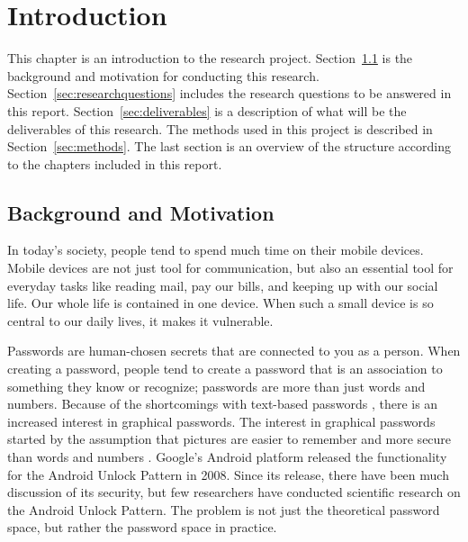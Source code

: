 \chapter{Introduction}

  This chapter is an introduction to the research project. Section~\ref{sec:background} is the background and motivation for conducting this research. Section~\ref{sec:researchquestions} includes the research questions to be answered in this report. Section~\ref{sec:deliverables} is a description of what will be the deliverables of this research.
  The methods used in this project is described in Section~\ref{sec:methods}. The last section is an overview of the structure according to the chapters included in this report. 

  \clearpage
  \section{Background and Motivation} \label{sec:background}
    In today's society, people tend to spend much time on their mobile devices. Mobile devices are not just tool for communication, but also an essential tool for everyday tasks like reading mail, pay our bills, and keeping up with our social life. Our whole life is contained in one device. When such a small device is so central to our daily lives, it makes it vulnerable.

    Passwords are human-chosen secrets that are connected to you as a person. When creating a password, people tend to create a password that is an association to something they know or recognize; passwords are more than just words and numbers. Because of the shortcomings with text-based passwords \cite{UnixPasswords}, there is an increased interest in graphical passwords. The interest in graphical passwords started by the assumption that pictures are easier to remember and more secure than words and numbers \cite{DeAngeli}. Google's Android platform released the functionality for the Android Unlock Pattern in 2008. Since its release, there have been much discussion of its security, but few researchers have conducted scientific research on the Android Unlock Pattern. The problem is not just the theoretical password space, but rather the password space in practice.


